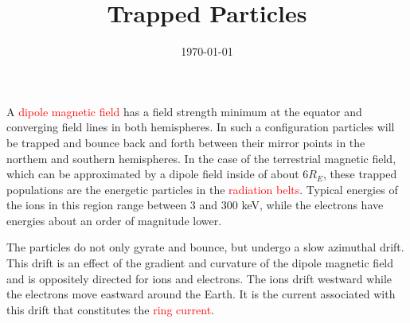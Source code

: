 \documentclass[12pt,a4paper]{article}
\title{Trapped Particles}
\author{}
\date{\today}
\begin{document}
\maketitle
\cite{1996bspp.book.....B} A \textcolor{red}{dipole magnetic field} has a field strength minimum at the equator and converging field lines in both hemispheres. In such a configuration particles will be trapped and bounce back and forth between their mirror points in the northem and southern hemispheres. In the case of the terrestrial magnetic field, which can be approximated by a dipole field inside of about $6 R_E$, these trapped populations are the energetic particles in the \textcolor{red}{radiation belts}. Typical energies of the ions in this region range between $3$ and $300$ keV, while the electrons have energies about an order of magnitude lower.

The particles do not only gyrate and bounce, but undergo a slow azimuthal drift. This drift is an effect of the gradient and curvature of the dipole magnetic field and is oppositely directed for ions and electrons. The ions drift westward while the electrons move eastward around the Earth. It is the current associated with this drift that constitutes the \textcolor{red}{ring current}.
\end{document}
